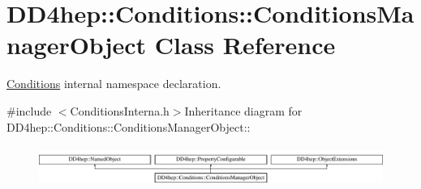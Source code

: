 \hypertarget{class_d_d4hep_1_1_conditions_1_1_conditions_manager_object}{
\section{DD4hep::Conditions::ConditionsManagerObject Class Reference}
\label{class_d_d4hep_1_1_conditions_1_1_conditions_manager_object}
}


\hyperlink{namespace_d_d4hep_1_1_conditions}{Conditions} internal namespace declaration.  


{\ttfamily \#include $<$ConditionsInterna.h$>$}Inheritance diagram for DD4hep::Conditions::ConditionsManagerObject::\begin{figure}[H]
\begin{center}
\leavevmode
\includegraphics[height=1.31455cm]{class_d_d4hep_1_1_conditions_1_1_conditions_manager_object}
\end{center}
\end{figure}
